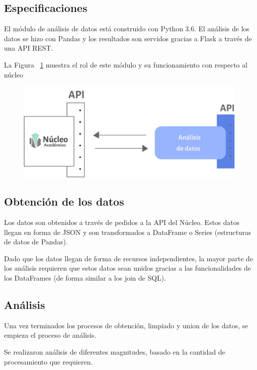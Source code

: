 \subsection{Especificaciones}

El módulo de análisis de datos está construido con Python 3.6. El análisis de los datos se hizo con Pandas y los resultados son servidos gracias a Flask a través de una API REST.


La Figura ~\ref{fig:analisis-nucleo} muestra el rol de este módulo y su funcionamiento con respecto al núcleo

\begin{figure}[h!]
  \centering
    \includegraphics[scale=0.8]{images/analisis-datos/analisis-datos.png}
  \label{fig:analisis-nucleo}
\end{figure}


\subsection{Obtención de los datos}

Los datos son obtenidos a través de pedidos a la API del Núcleo. Estos datos llegan en forma de JSON y son transformados a DataFrame o Series (estructuras de datos de Pandas). 

Dado que los datos llegan de forma de recursos independientes, la mayor parte de los análisis requieren que estos datos sean unidos gracias a las funcionalidades de los DataFrames (de forma similar a los join de SQL).

\subsection{Análisis}

Una vez terminados los procesos de obtención, limpiado y union de los datos, se empieza el proceso de análisis.

Se realizaron análisis de diferentes magnitudes, basado en la cantidad de procesamiento que requieren. 
